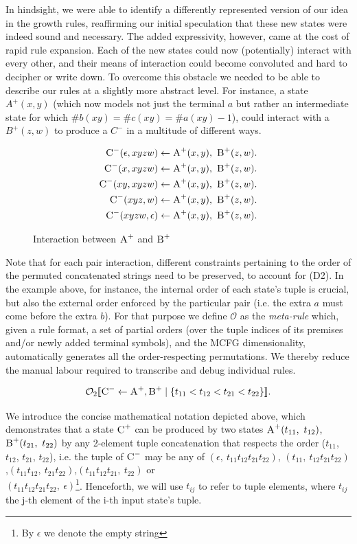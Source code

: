 \documentclass[nonatbib,numbers,10pt]{llncs}
\newcommand\s{\textsc}
\newcommand{\Order}[5]{
	\[
	\mathcal{#1}_{#5}\llbracket #2 \leftarrow #3 \mid \{ #4 \} \rrbracket.
	\]
}
\newcommand{\Ord}[4]{\Order{O}{#1}{#2}{#3}{#4}}
\begin{document}
In hindsight, we were able to identify a differently represented version of our idea in the growth rules, reaffirming our initial speculation that these new states were indeed sound and necessary. The added expressivity, however, came at the cost of rapid rule expansion. Each of the new states could now (potentially) interact with every other, and their means of interaction could become convoluted and hard to decipher or write down. To overcome this obstacle we needed to be able to describe our rules at a slightly more abstract level. For instance, a state $A^{+}(x,y)$ (which now models not just the terminal $a$ but rather an intermediate state for which $ \# b(xy) = \# c(xy) = \# a(xy)-1$), could interact with a $B^{+}(z,w)$ to produce a $C^{-}$ in a multitude of different ways.
\begin{figure}[h!]
\begin{align*}
\setcounter{equation}{0}
\s{C}^-(\epsilon, xyzw) \leftarrow \s{A}^+(x,y),\ \s{B}^+(z,w)&. \\
\s{C}^-(x, xyzw) \leftarrow \s{A}^+(x,y),\ \s{B}^+(z,w)&. \\
\s{C}^-(xy, xyzw) \leftarrow \s{A}^+(x,y),\ \s{B}^+(z,w)&. \\
\s{C}^-(xyz, w) \leftarrow \s{A}^+(x,y),\ \s{B}^+(z,w)&. \\
\s{C}^-(xyzw, \epsilon) \leftarrow \s{A}^+(x,y),\ \s{B}^+(z,w)&.
\end{align*}
\caption{Interaction between $\s{A}^+$ and $\s{B}^+$}
\label{fig:interaction}
\end{figure}

Note that for each pair interaction, different constraints pertaining to the order of the permuted concatenated strings need to be preserved, to account for (D2). In the example above, for instance, the internal order of each state's tuple is crucial, but also the external order enforced by the particular pair (i.e. the extra $a$ must come before the extra $b$). For that purpose we define $\mathcal{O}$ as the \textit{meta-rule} which, given a rule format, a set of partial orders (over the tuple indices of its premises and/or newly added terminal symbols), and the MCFG dimensionality, automatically generates all the order-respecting permutations. We thereby reduce the manual labour required to transcribe and debug individual rules.
\Ord{\s{C}^-}{\s{A}^+, \s{B}^+}{t_{11} < t_{12} < t_{21} < t_{22}}{2}
We introduce the concise mathematical notation depicted above, which demonstrates that a state $\textsc{C}^{+}$ can be produced by two states $\textsc{A}^{+}(t_{11},\ t_{12})$, $\textsc{B}^{+}(t_{21},\ t_{22})$ by any 2-element tuple concatenation that respects the order ($t_{11}$, $t_{12}$, $t_{21}$, $t_{22}$), i.e. the tuple of $\textsc{C}^{-}$ may be any of $(\epsilon,\ t_{11}t_{12}t_{21}t_{22})$, $(t_{11},\ t_{12}t_{21}t_{22})$,\quad $(t_{11}t_{12},\ t_{21}t_{22})$,\quad $(t_{11}t_{12}t_{21},\ t_{22})$ \quad or \\ $(t_{11}t_{12}t_{21}t_{22},\ \epsilon)$\footnote{By $\epsilon$ we denote the empty string}. Henceforth, we will use $t_{ij}$ to refer to tuple elements, where $t_{ij}$ the j-th element of the i-th input state's tuple. 
\end{document}
